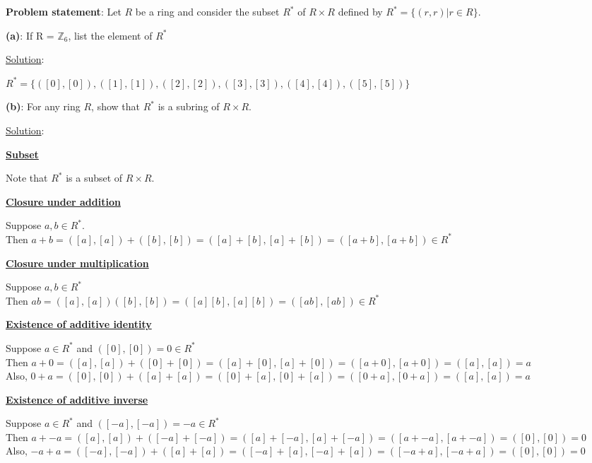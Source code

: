 \documentclass{article} %
\begin{document}
\textbf{Problem statement}: Let $R$ be a ring and consider the subset $R^*$ of $R \times R$ defined by $R^* = \{(r,r)|r \in R\}$.
\\

\begin{addmargin}[1em]{0em}

\textbf{(a)}: If R = $\mathbb{Z}_6$, list the element of $R^*$
\begin{addmargin}[1em]{0em}
\underline{Solution}:
\begin{addmargin}[1em]{0em}
$R^* = \{([0],[0]),([1],[1]), ([2],[2]), ([3],[3]), ([4],[4]),([5],[5])\}$
\end{addmargin}
\end{addmargin}   
\hfill \break
\textbf{(b)}: For any ring $R$, show that $R^*$ is a subring of $R \times R$.
\begin{addmargin}[1em]{0em}
\underline{Solution}: 
\begin{addmargin}[1em]{0em}
\underline{\textbf{Subset}}
\begin{addmargin}[1em]{0em}
Note that $R^*$ is a subset of $R \times R$. 
\end{addmargin} 

\underline{\textbf{Closure under addition}}
\begin{addmargin}[1em]{0em}
Suppose $a,b \in R^*$.  
\\Then $a + b = ([a],[a]) + ([b], [b]) = ([a] + [b], [a] + [b]) = ([a + b], [a + b]) \in R^*$ 
\end{addmargin}

\underline{\textbf{Closure under multiplication}}
\begin{addmargin}[1em]{0em}
Suppose $a,b \in R^*$
\\Then $ab = ([a], [a])([b],[b]) = ([a][b], [a][b]) = ([ab], [ab]) \in R^*$
\end{addmargin}

\underline{\textbf{Existence of additive identity}}
\begin{addmargin}[1em]{0em}
Suppose $a \in R^*$ and $([0], [0]) = 0 \in R^*$
\\Then $a + 0 = ([a], [a]) + ([0] + [0]) = ([a] + [0], [a] + [0]) = ([a + 0], [a + 0]) = ([a], [a]) = a$
\\Also, $0 + a = ([0], [0]) + ([a] + [a]) = ([0] + [a], [0] + [a]) = ([0 + a], [0 + a]) = ([a], [a]) = a$
\end{addmargin}

\underline{\textbf{Existence of additive inverse}}
\begin{addmargin}[1em]{0em}
Suppose $a \in R^*$ and $([-a], [-a]) = -a \in R^*$
\\Then $a + -a = ([a], [a]) + ([-a] + [-a]) = ([a] + [-a], [a] + [-a]) = ([a + -a], [a + -a]) = ([0], [0]) = 0$
\\Also, $-a + a = ([-a], [-a]) + ([a] + [a]) = ([-a] + [a], [-a] + [a]) = ([-a + a], [-a + a]) = ([0], [0]) = 0$
\end{addmargin}
\end{addmargin}
\end{addmargin}
\end{addmargin}
\end{document}
